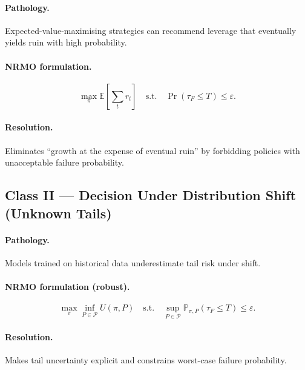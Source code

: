 \paragraph{Pathology.}
Expected-value-maximising strategies can recommend leverage that
eventually yields ruin with high probability.

\paragraph{NRMO formulation.}

\begin{equation}
\max_\pi \mathbb{E}\!\left[\sum_t r_t\right]
\quad \text{s.t.} \quad
\Pr(\tau_F \le T) \le \varepsilon.
\end{equation}

\paragraph{Resolution.}
Eliminates ``growth at the expense of eventual ruin'' by forbidding
policies with unacceptable failure probability.

\subsection{Class II --- Decision Under Distribution Shift
(Unknown Tails)}
\label{sec:foundations-7-2-class-II}

\paragraph{Pathology.}
Models trained on historical data underestimate tail risk under
shift.

\paragraph{NRMO formulation (robust).}

\begin{equation}
\max_\pi \inf_{P \in \mathcal{P}} U(\pi, P)
\quad \text{s.t.} \quad
\sup_{P \in \mathcal{P}} \mathbb{P}_{\pi, P}(\tau_F \le T) \le \varepsilon.
\end{equation}

\paragraph{Resolution.}
Makes tail uncertainty explicit and constrains worst-case failure
probability.

